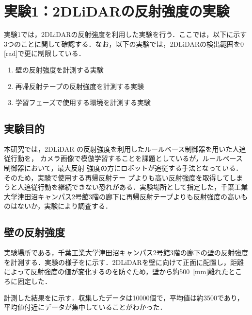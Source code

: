 
\section{実験1：2DLiDARの反射強度の実験}

  実験1では，2DLiDARの反射強度を利用した実験を行う．ここでは，以下に示す3つのことに関して確認する．なお，以下の実験では，2DLiDARの検出範囲を0 \,[rad]で更に制限している．

  \begin{enumerate}
    \item 壁の反射強度を計測する実験
    \item 再帰反射テープの反射強度を計測する実験
    \item 学習フェーズで使用する環境を計測する実験
  \end{enumerate}

\subsection{実験目的}

本研究では，2DLiDAR の反射強度を利用したルールベース制御器を用いた人追従行動を，
カメラ画像で模倣学習することを課題としているが，ルールベース制御器において，最大反射
強度の方にロボットが追従する手法となっている．そのため，実験で使用する再帰反射テー
プよりも高い反射強度を取得してしまうと人追従行動を継続できない恐れがある．実験場所として指定した，千葉工業大学津田沼キャンパス2号館3階の廊下に再帰反射テープよりも反射強度の高いものはないか，実験により調査する．

\newpage

\subsection{壁の反射強度}

  実験場所である，千葉工業大学津田沼キャンパス2号館3階の廊下の壁の反射強度を計測する．実験の様子をに示す．2DLiDARを壁に向けて正面に配置し，距離によって反射強度の値が変化するのを防ぐため，壁から約500 \,[mm]離れたところに固定した．
  
  計測した結果をに示す．収集したデータは10000個で，平均値は約3500であり，平均値付近にデータが集中していることがわかった．

